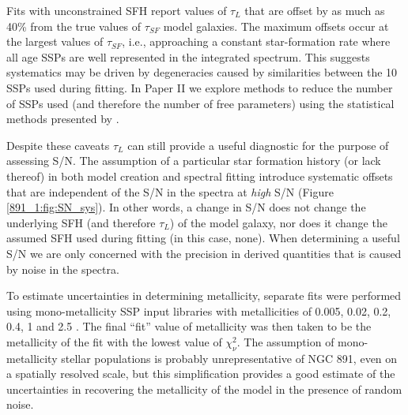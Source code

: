 Fits with unconstrained SFH report values of $\tau_L$ that are offset
by as much as 40\% from the true values of $\tau_{SF}$ model
galaxies. The maximum offsets occur at the largest values of
$\tau_{SF}$, i.e., approaching a constant star-formation rate where
all age SSPs are well represented in the integrated spectrum.  This
suggests systematics may be driven by degeneracies caused by
similarities between the 10 SSPs used during fitting.  In Paper II we
explore methods to reduce the number of SSPs used (and therefore the
number of free parameters) using the statistical methods presented by
\citet{Mosby15}.



Despite these caveats $\tau_L$ can still provide a useful diagnostic
for the purpose of assessing S/N. The assumption of a particular star
formation history (or lack thereof) in both model creation and
spectral fitting introduce systematic offsets that are independent of
the S/N in the spectra at {\it high} S/N (Figure \ref{891_1:fig:SN_sys}). In
other words, a change in S/N does not change the underlying SFH (and
therefore $\tau_L$) of the model galaxy, nor does it change the
assumed SFH used during fitting (in this case, none). When determining
a useful S/N we are only concerned with the precision in derived
quantities that is caused by noise in the spectra.

To estimate uncertainties in determining metallicity, separate fits
were performed using mono-metallicity SSP input libraries with
metallicities of 0.005, 0.02, 0.2, 0.4, 1 and 2.5 \Zsol.  The final
``fit'' value of metallicity was then taken to be the metallicity of
the fit with the lowest value of $\chi^2_\nu$. The assumption of
mono-metallicity stellar populations is probably unrepresentative of
NGC 891, even on a spatially resolved scale, but this simplification
provides a good estimate of the uncertainties in recovering the
metallicity of the model in the presence of random noise.

%
% 
% 
% 
% 
% 
%  
%

